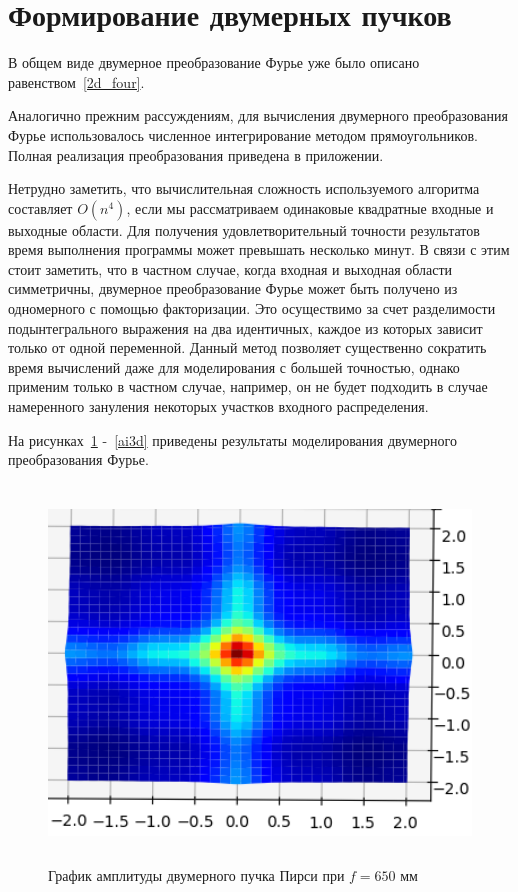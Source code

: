     \section{Формирование двумерных пучков}{

    \vspace{-0.2cm}
    В общем виде двумерное преобразование Фурье уже было описано равенством~\eqref{2d_four}.

    Аналогично прежним рассуждениям, для вычисления двумерного преобразования Фурье использовалось численное
    интегрирование методом прямоугольников. Полная реализация преобразования приведена в приложении.

    Нетрудно заметить, что вычислительная сложность используемого алгоритма составляет $O(n^4)$,
    если мы рассматриваем одинаковые квадратные входные и выходные области.
    Для получения удовлетворительный точности результатов время выполнения программы может
    превышать несколько минут. В связи с этим стоит заметить, что в частном случае,
    когда входная и выходная области симметричны, двумерное преобразование Фурье может
    быть получено из одномерного с помощью факторизации. Это осуществимо за счет разделимости подынтегрального
    выражения на два идентичных, каждое из которых зависит только от одной переменной.
    Данный метод позволяет существенно сократить время вычислений даже для моделирования с большей точностью,
    однако применим только в частном случае, например, он не будет подходить в случае
    намеренного зануления некоторых участков входного распределения.

    На рисунках~\ref{pe3d} -~\ref{ai3d} приведены результаты моделирования двумерного преобразования Фурье.
    \begin{figure}[H]
        \centering
        \includegraphics[height = 10cm]{plots/pe3d}
        \vspace{0.2cm}
        \caption{График амплитуды двумерного пучка Пирси при $f = 650$ мм}
        \label{pe3d}
    \end{figure}

}

